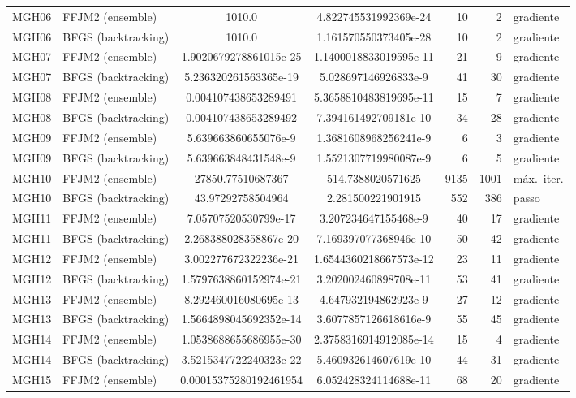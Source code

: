 \documentclass[11pt]{article}
\begin{document}
\begin{longtable}{l l S[table-format=1.3e2] S[table-format=1.3e2] r r l}
\midrule
MGH06 & FFJM2 (ensemble) & 1010.0 & 4.822745531992369e-24 & 10 & 2 & gradiente \\
MGH06 & BFGS (backtracking) & 1010.0 & 1.161570550373405e-28 & 10 & 2 & gradiente \\
\midrule
MGH07 & FFJM2 (ensemble) & 1.9020679278861015e-25 & 1.1400018833019595e-11 & 21 & 9 & gradiente \\
MGH07 & BFGS (backtracking) & 5.236320261563365e-19 & 5.028697146926833e-9 & 41 & 30 & gradiente \\
\midrule
MGH08 & FFJM2 (ensemble) & 0.004107438653289491 & 5.3658810483819695e-11 & 15 & 7 & gradiente \\
MGH08 & BFGS (backtracking) & 0.004107438653289492 & 7.394161492709181e-10 & 34 & 28 & gradiente \\
\midrule
MGH09 & FFJM2 (ensemble) & 5.639663860655076e-9 & 1.3681608968256241e-9 & 6 & 3 & gradiente \\
MGH09 & BFGS (backtracking) & 5.639663848431548e-9 & 1.5521307719980087e-9 & 6 & 5 & gradiente \\
\midrule
MGH10 & FFJM2 (ensemble) & 27850.77510687367 & 514.7388020571625 & 9135 & 1001 & m\'ax.\ iter. \\
MGH10 & BFGS (backtracking) & 43.97292758504964 & 2.281500221901915 & 552 & 386 & passo \\
\midrule
MGH11 & FFJM2 (ensemble) & 7.05707520530799e-17 & 3.207234647155468e-9 & 40 & 17 & gradiente \\
MGH11 & BFGS (backtracking) & 2.268388028358867e-20 & 7.169397077368946e-10 & 50 & 42 & gradiente \\
\midrule
MGH12 & FFJM2 (ensemble) & 3.002277672322236e-21 & 1.6544360218667573e-12 & 23 & 11 & gradiente \\
MGH12 & BFGS (backtracking) & 1.5797638860152974e-21 & 3.202002460898708e-11 & 53 & 41 & gradiente \\
\midrule
MGH13 & FFJM2 (ensemble) & 8.292460016080695e-13 & 4.647932194862923e-9 & 27 & 12 & gradiente \\
MGH13 & BFGS (backtracking) & 1.5664898045692352e-14 & 3.6077857126618616e-9 & 55 & 45 & gradiente \\
\midrule
MGH14 & FFJM2 (ensemble) & 1.0538688655686955e-30 & 2.3758316914912085e-14 & 15 & 4 & gradiente \\
MGH14 & BFGS (backtracking) & 3.5215347722240323e-22 & 5.460932614607619e-10 & 44 & 31 & gradiente \\
\midrule
MGH15 & FFJM2 (ensemble) & 0.00015375280192461954 & 6.052428324114688e-11 & 68 & 20 & gradiente \\

\end{longtable}
\end{document}
